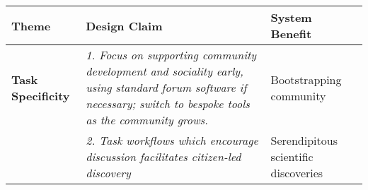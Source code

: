 \documentclass{sigchi}
\begin{document}
\begin{spacing}{0.97}

\begin{spacing}{0.8}
\begin{table*}[ht!]
\small
\begin{tabular}{p{2.5cm}p{10cm}p{4cm}}
Theme & Design Claim & System Benefit \\
\hline
\hline
\textbf{Task Specificity}& \emph{1. Focus on supporting community development and sociality early, using standard forum software if necessary; switch to bespoke tools as the community grows. } & Bootstrapping community \\

&\emph{2. Task workflows which encourage discussion facilitates citizen-led discovery} & Serendipitous scientific discoveries\\


\hline


\end{tabular}
\end{table*}
\end{spacing}
\end{spacing}
\end{document}
